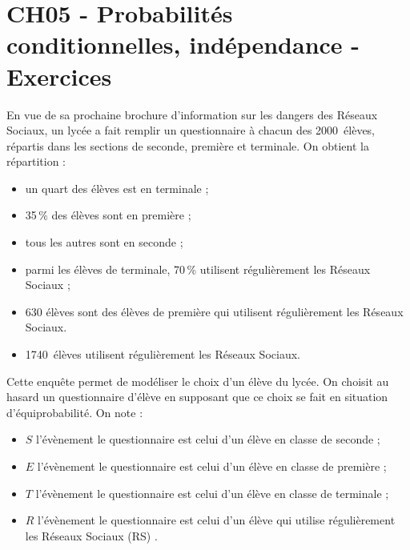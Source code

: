\documentclass[a4paper,11pt]{article}
\author{Pierquet}
\title{\nomfichier}
\begin{document}
\pagestyle{fancy}

\part{CH05 - Probabilités conditionnelles, indépendance - Exercices}

\smallskip

\exonum{}

\medskip

En vue de sa prochaine brochure d'information sur les dangers des Réseaux Sociaux, un lycée a fait remplir un questionnaire à chacun des \num{2000}~élèves, répartis dans les sections de seconde, première et terminale. On obtient la répartition : 

\begin{itemize}
	\item un quart des élèves est en terminale ; 
	\item 35\,\% des élèves sont en première ; 
	\item tous les autres sont en seconde ; 
	\item parmi les élèves de terminale, 70\,\% utilisent régulièrement les Réseaux Sociaux ; 
	\item 630 élèves sont des élèves de première qui utilisent régulièrement les Réseaux Sociaux.
	\item \num{1740}~élèves utilisent régulièrement les Réseaux Sociaux.
\end{itemize}

Cette enquête permet de modéliser le choix d'un élève du lycée. On choisit au hasard un questionnaire d'élève en supposant que ce choix se fait en situation d'équiprobabilité. On note :

\begin{itemize}
	\item $S$ l'évènement \og le questionnaire est celui d'un élève en classe de seconde \fg ;
	\item $E$ l'évènement \og le questionnaire est celui d'un élève en classe de première \fg ;
	\item $T$ l'évènement \og le questionnaire est celui d'un élève en classe de terminale \fg ;
	\item $R$ l'évènement \og le questionnaire est celui d'un élève qui utilise régulièrement les Réseaux Sociaux (RS) \fg.
\end{itemize}
\end{document}
